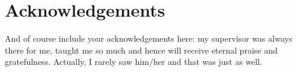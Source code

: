\chapter*{Acknowledgements}
\label{ch:Acknowledgements}

And of course include your acknowledgements here: my supervisor was always there for me, taught me so much and hence will receive eternal praise and gratefulness. Actually, I rarely saw him/her and that was just as well.
